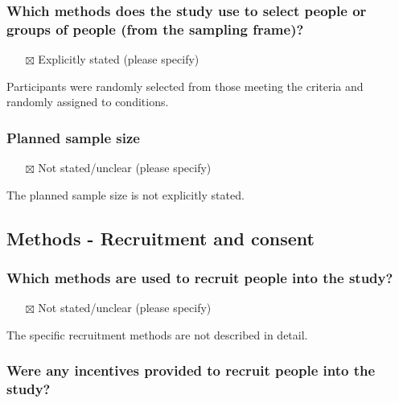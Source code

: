 \documentclass[
  doc, a4paper]{apa7}
\providecommand{\tightlist}{%
  \setlength{\itemsep}{0pt}\setlength{\parskip}{0pt}}
\begin{document}
\subsubsection{Which methods does the study use to select people or groups of people (from the sampling frame)?}\label{which-methods-does-the-study-use-to-select-people-or-groups-of-people-from-the-sampling-frame}

\begin{itemize}
\tightlist
\item[$\boxtimes$]
  Explicitly stated (please specify)
\end{itemize}

Participants were randomly selected from those meeting the criteria and randomly assigned to conditions.

\subsubsection{Planned sample size}\label{planned-sample-size}

\begin{itemize}
\tightlist
\item[$\boxtimes$]
  Not stated/unclear (please specify)
\end{itemize}

The planned sample size is not explicitly stated.

\subsection{Methods - Recruitment and consent}\label{methods---recruitment-and-consent}

\subsubsection{Which methods are used to recruit people into the study?}\label{which-methods-are-used-to-recruit-people-into-the-study}

\begin{itemize}
\tightlist
\item[$\boxtimes$]
  Not stated/unclear (please specify)
\end{itemize}

The specific recruitment methods are not described in detail.

\subsubsection{Were any incentives provided to recruit people into the study?}\label{were-any-incentives-provided-to-recruit-people-into-the-study}
\end{document}

